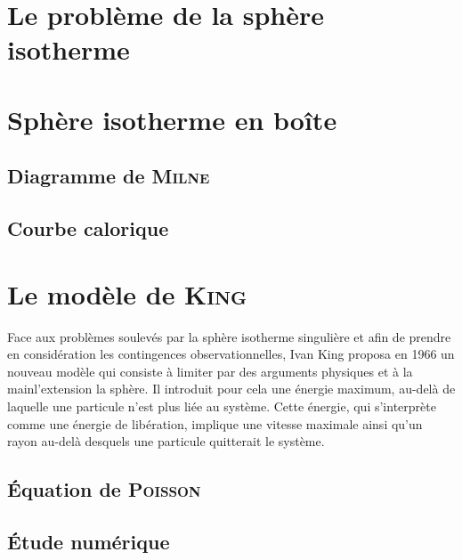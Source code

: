 \chapter{Le problème de la sphère isotherme}
		\minitoc
		
		

\chapter{Sphère isotherme en boîte\label{SIB::Chapitre}}
	\minitoc

	\section{Diagramme de \textsc{Milne}}
		

	\section{Courbe calorique}
		

%			

\chapter{Le modèle de \textsc{King}\label{King::Chapitre}}
	\minitoc
Face aux problèmes soulevés par la sphère isotherme singulière et afin de prendre en considération les contingences observationnelles, Ivan King proposa en 1966 un nouveau modèle
qui consiste à limiter par des arguments physiques et \og à la main\fg l'extension la sphère.
Il introduit pour cela une énergie maximum, au-delà de laquelle une particule n'est plus liée au système.
Cette énergie, qui s'interprète comme une énergie de libération, implique une vitesse maximale ainsi qu'un rayon au-delà desquels une particule quitterait le système.

	\section{Équation de \textsc{Poisson}}
		

	\section{Étude numérique}
		


